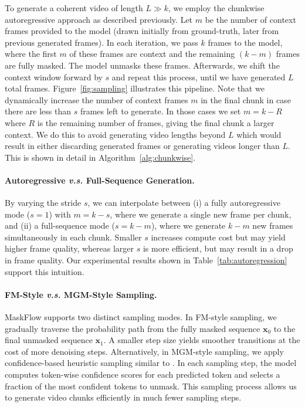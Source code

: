  To generate a coherent video of length \(L \gg k\), we employ the chunkwise autoregressive approach as described previously. Let \(m\) be the number of context frames provided to the model (drawn initially from ground-truth, later from previous generated frames). In each iteration, we pass \(k\) frames to the model, where the first \(m\) of these frames are context and the remaining \((k - m)\) frames are fully masked. The model unmasks these frames. Afterwards, we shift the context window forward by \(s\) and repeat this process, until we have generated \(L\) total frames. Figure~\ref{fig:sampling} illustrates this pipeline. Note that we dynamically increase the number of context frames $m$ in the final chunk in case there are less than $s$ frames left to generate. In those cases we set $m = k - R$ where $R$ is the remaining number of frames, giving the final chunk a larger context. We do this to avoid generating video lengths beyond $L$ which would result in either discarding generated frames or generating videos longer than $L$. This is shown in detail in Algorithm~\ref{alg:chunkwise}.

\paragraph{Autoregressive \textit{v.s.} Full-Sequence Generation.}
By varying the stride \(s\), we can interpolate between (i) a fully autoregressive mode (\(s = 1\)) with $m = k - s$, where we generate a single new frame per chunk, and (ii) a full-sequence mode (\(s = k - m\)), where we generate $k - m$ new frames simultaneously in each chunk. Smaller \(s\) increases compute cost but may yield higher frame quality, whereas larger \(s\) is more efficient, but may result in a drop in frame quality. Our experimental results shown in Table~\ref{tab:autoregression} support this intuition.

\paragraph{FM-Style \textit{v.s.} MGM-Style Sampling.}
MaskFlow supports two distinct sampling modes. In FM-style sampling, we gradually traverse the probability path from the fully masked sequence $\mathbf{x}_0$ to the final unmasked sequence $\mathbf{x}_1$. A smaller step size yields smoother transitions at the cost of more denoising steps. Alternatively, in MGM-style sampling, we apply confidence-based heuristic sampling similar to \citet{chang2022maskgit}. In each sampling step, the model computes token-wise confidence scores for each predicted token and selects a fraction of the most confident tokens to unmask. This sampling process allows us to generate video chunks efficiently in much fewer sampling steps.
\vspace{-10pt}

